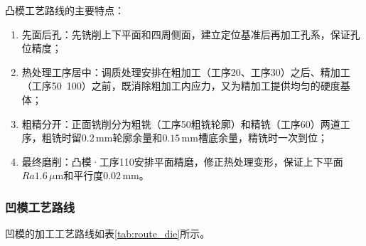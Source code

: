 \documentclass{xautCADreport}
\begin{document}
凸模工艺路线的主要特点：
\begin{enumerate}
  \item 先面后孔：先铣削上下平面和四周侧面，建立定位基准后再加工孔系，保证孔位精度；
  \item 热处理工序居中：调质处理安排在粗加工（工序20、工序30）之后、精加工（工序50~100）之前，既消除粗加工内应力，又为精加工提供均匀的硬度基体；
  \item 粗精分开：正面铣削分为粗铣（工序50粗铣轮廓）和精铣（工序60）两道工序，粗铣时留$0.2\,\mathrm{mm}$轮廓余量和$0.15\,\mathrm{mm}$槽底余量，精铣时一次到位；
  \item 最终磨削：凸模·工序110安排平面精磨，修正热处理变形，保证上下平面$Ra1.6\,\mu\mathrm{m}$和平行度$0.02\,\mathrm{mm}$。
\end{enumerate}

\subsubsection{凹模工艺路线}

凹模的加工工艺路线如表\ref{tab:route_die}所示。
\end{document}
